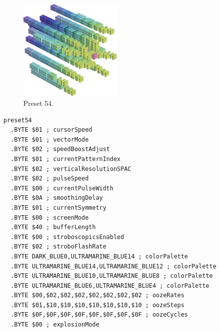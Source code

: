 \clearpage
\begin{minipage}[b]{0.48\linewidth}
\begin{figure}[H]                                                          
  \centering                                                             
  \begin{adjustbox}{width=5cm,center}                                   
  \includegraphics[width=5cm]{src/colorspace_presets/preset54-45.png}%
  \end{adjustbox}                                                        
\caption*{Preset 54.}                                           
\end{figure}                                                               
\end{minipage}
\hspace{0.1cm}
\begin{minipage}[b]{0.48\linewidth}                            
\begin{lstlisting}[basicstyle=\ttfamily\tiny]
preset54
  .BYTE $01 ; cursorSpeed
  .BYTE $01 ; vectorMode
  .BYTE $02 ; speedBoostAdjust
  .BYTE $01 ; currentPatternIndex
  .BYTE $02 ; verticalResolutionSPAC
  .BYTE $02 ; pulseSpeed
  .BYTE $00 ; currentPulseWidth
  .BYTE $0A ; smoothingDelay
  .BYTE $01 ; currentSymmetry
  .BYTE $00 ; screenMode
  .BYTE $40 ; bufferLength
  .BYTE $00 ; stroboscopicsEnabled
  .BYTE $02 ; stroboFlashRate
  .BYTE DARK_BLUE0,ULTRAMARINE_BLUE14 ; colorPalette
  .BYTE ULTRAMARINE_BLUE14,ULTRAMARINE_BLUE12 ; colorPalette
  .BYTE ULTRAMARINE_BLUE10,ULTRAMARINE_BLUE8 ; colorPalette
  .BYTE ULTRAMARINE_BLUE6,ULTRAMARINE_BLUE4 ; colorPalette
  .BYTE $00,$02,$02,$02,$02,$02,$02,$02 ; oozeRates
  .BYTE $01,$10,$10,$10,$10,$10,$10,$10 ; oozeSteps
  .BYTE $0F,$0F,$0F,$0F,$0F,$0F,$0F,$0F ; oozeCycles
  .BYTE $00 ; explosionMode
\end{lstlisting}
\end{minipage}

\vspace*{0.3cm}

